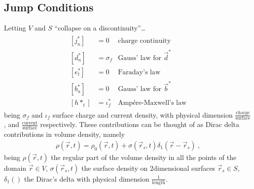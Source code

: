 \documentclass[letterpaper,10pt,english]{jupyterBook}
\begin{document}
\subsection{Jump Conditions}
\label{\detokenize{ch/principles-matter:jump-conditions}}\label{\detokenize{ch/principles-matter:classical-electromagnetism-media-jump}}
\sphinxAtStartPar
Letting \(V\) and \(S\) “collapse on a discontinuity”…
\begin{equation}\label{equation:ch/principles-matter:eq:em-jump}
\begin{split}\begin{aligned}
  \left[ j^*_n \right] & = 0         & \text{charge continuity} \\
  [ d^*_n ] & = \sigma_f             & \text{Gauss' law for $\vec{d}^*$} \\
  [ e^*_t ] & = 0                    & \text{Faraday's law} \\
  [ b^*_n ] & = 0                    & \text{Gauss' law for $\vec{b}^*$} \\
  [ h*_t ]  & = \iota^*_f            & \text{Ampére-Maxwell's law} 
\end{aligned}\end{split}
\end{equation}
\sphinxAtStartPar
being \(\sigma_f\) and \(\iota_f\) surface charge and current density, with physical dimension \(\frac{\text{charge}}{\text{surface}}\), and \(\frac{\text{current}}{\text{surface}}\) respectively. These contributions can be thought of as Dirac delta contributions in volume density, namely
\begin{equation*}
\begin{split}\rho(\vec{r},t) = \rho_0(\vec{r},t) + \sigma(\vec{r}_s,t) \delta_{1}(\vec{r}-\vec{r}_s) \ ,\end{split}
\end{equation*}
\sphinxAtStartPar
being \(\rho(\vec{r},t)\) the regular part of the volume density in all the points of the domain \(\vec{r} \in V\), \(\sigma(\vec{r}_s,t)\) the surface density on 2\sphinxhyphen{}dimensional surfaces \(\vec{r}_s \in S\), \(\delta_1()\) the Dirac’s delta with physical dimension \(\frac{1}{\text{length}}\).
\end{document}
